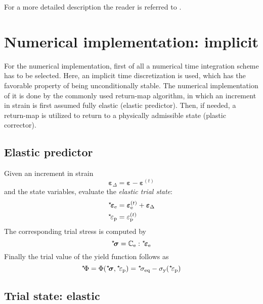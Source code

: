 \documentclass[times]{goose-article}
\newcommand\leftstar[1]{\hspace*{-.3em}~^\star\!#1}
\begin{document}
For a more detailed description the reader is referred to \citet[][p.\ 216-234]{DeSouzaNeto2008}.

\section{Numerical implementation: implicit}

For the numerical implementation, first of all a numerical time integration scheme has to be selected. Here, an implicit time discretization is used, which has the favorable property of being unconditionally stable. The numerical implementation of it is done by the commonly used return-map algorithm, in which an increment in strain is first assumed fully elastic (elastic predictor). Then, if needed, a return-map is utilized to return to a physically admissible state (plastic corrector).

\subsection{Elastic predictor}

Given an increment in strain
\begin{equation}
  \bm{\varepsilon}_\Delta
  = \bm{\varepsilon} - \bm{\varepsilon}^{(t)}
\end{equation}
and the state variables, evaluate the \emph{elastic trial state}:
\begin{align}
  \leftstar{\bm{\varepsilon}}_\mathrm{e}
  &= \bm{\varepsilon}_\mathrm{e}^{(t)} + \bm{\varepsilon}_\Delta
  \\
  \leftstar{\varepsilon}_\mathrm{p}
  &= \varepsilon_\mathrm{p}^{(t)}
\end{align}
The corresponding trial stress is computed by
\begin{equation}
  \leftstar{\bm{\sigma}}
  = \mathbb{C}_\mathrm{e} : \leftstar{\bm{\varepsilon}}_\mathrm{e}
\end{equation}
Finally the trial value of the yield function follows as
\begin{equation}
  \leftstar{\Phi}
  = \Phi( \leftstar{\bm{\sigma}} , \leftstar{\varepsilon}_\mathrm{p} )
  = \leftstar{\sigma}_\mathrm{eq}
  - \sigma_\mathrm{y} (\leftstar{\varepsilon}_\mathrm{p})
\end{equation}

\subsection{Trial state: elastic}
\end{document}
